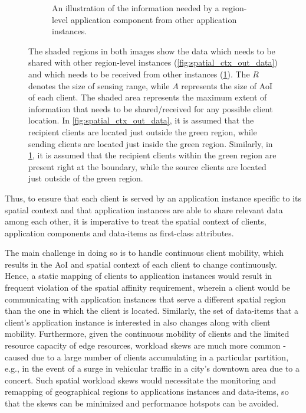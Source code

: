 \begin{figure}
\begin{subfigure}{0.4\textwidth}
  \caption{An illustration of the information needed by a region-level application component from other application instances. }
  \label{fig:spatial_ctx_in_data}
\end{subfigure}
\caption{The shaded regions in both images show the data which needs to be shared with other region-level instances (\cref{fig:spatial_ctx_out_data}) and which needs to be received from other instances (\cref{fig:spatial_ctx_in_data}). The $R$ denotes the size of sensing range, while $A$ represents the size of AoI of each client. The shaded area represents the maximum extent of information that needs to be shared/received for any possible client location. In \cref{fig:spatial_ctx_out_data}, it is assumed that the recipient clients are located just outside the green region, while sending clients are located just inside the green region. Similarly, in \cref{fig:spatial_ctx_in_data}, it is assumed that the recipient clients within the green region are present right at the boundary, while the source clients are located just outside of the green region.}
\label{fig:spatial_data_sharing}
\end{figure}
Thus, to ensure that each client is served by an application instance specific to its spatial context and that application instances are able to share relevant data among each other, it is imperative to treat the spatial context of clients, application components and data-items as first-class attributes. 
\par The main challenge in doing so is to handle continuous client mobility, which results in the AoI and spatial context of each client to change continuously. Hence, a static mapping of clients to application instances would result in frequent violation of the spatial affinity requirement, wherein a client would be communicating with application instances that serve a different spatial region than the one in which the client is located. Similarly, the set of data-items that a client's application instance is interested in also changes along with client mobility.  Furthermore, given the continuous mobility of clients and the limited resource capacity of edge resources, workload skews are much more common - caused due to a large number of clients accumulating in a particular partition, e.g., in the event of a surge in vehicular traffic in a city's downtown area due to a concert. Such spatial workload skews would necessitate the monitoring and remapping of geographical regions to applications instances and data-items, so that the skews can be minimized and performance hotspots can be avoided.

